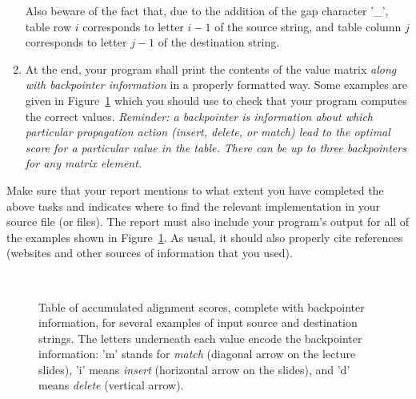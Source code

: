 \documentclass[a4paper,10pt]{article}
\begin{document}
\begin{enumerate}
  Also beware of the fact that, due to the addition of the gap character '\_', table row $i$ corresponds to letter $i-1$ of the source string, and table column $j$ corresponds to letter $j-1$ of the destination string.
\item
  At the end, your program shall print the contents of the value matrix \emph{along with backpointer information} in a properly formatted way.
  Some examples are given in Figure~\ref{fig:example-tables} which you should use to check that your program computes the correct values.
  \emph{
    Reminder: a backpointer is information about which particular propagation action (insert, delete, or match) lead to the optimal score for a particular value in the table.
    There can be up to three backpointers for any matrix element.
  }
\end{enumerate}

Make sure that your report mentions to what extent you have completed the above tasks and indicates where to find the relevant implementation in your source file (or files).
The report must also include your program's output for all of the examples shown in Figure~\ref{fig:example-tables}.
As usual, it should also properly cite references (websites and other sources of information that you used).

\begin{figure}
  \fbox{\begin{minipage}{55mm}
      \footnotesize
      
  \end{minipage}}\hfill
  \fbox{\begin{minipage}{32mm}
      \footnotesize
      
  \end{minipage}}\hfill
  \fbox{\begin{minipage}{32mm}
      \footnotesize
      
  \end{minipage}}\\[\baselineskip]
  \fbox{\begin{minipage}{\columnwidth}
      \footnotesize
      
  \end{minipage}}
  \caption{
    Table of accumulated alignment scores, complete with backpointer information, for several examples of input source and destination strings.
    The letters underneath each value encode the backpointer information:
    'm' stands for \emph{match} (diagonal arrow on the lecture slides),
    'i' means \emph{insert} (horizontal arrow on the slides),
    and 'd' means \emph{delete} (vertical arrow).
  }\label{fig:example-tables}
\end{figure}
\end{document}

